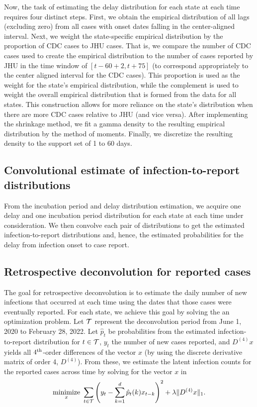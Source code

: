 \documentclass{article}
\begin{document}
Now, the task of estimating the delay distribution for each state at each time
requires four distinct steps. First, we obtain the empirical
distribution of all lags (excluding zero) from all cases with onset dates
falling in the center-aligned interval. Next, we weight the state-specific
empirical distribution by the proportion of CDC cases to JHU cases. That is, we
compare the number of CDC cases used to create the empirical distribution to the
number of cases reported by JHU in the time window of $\left[t - 60 + 2, t +
75\right]$ (to correspond appropriately to the center aligned interval for
the CDC cases). This proportion is used as the weight for the state's empirical
distribution, while the complement is used to weight the overall empirical
distribution that is formed from the data for all states. This construction
allows for more reliance on the state's distribution when there are more CDC
cases relative to JHU (and vice versa). After implementing the shrinkage method,
we fit a gamma density to the resulting empirical distribution by the method of
moments. Finally, we discretize the resulting density to the support set of 1
to 60 days.
 
\subsection{Convolutional estimate of infection-to-report distributions} 

From the incubation period and delay distribution estimation, we acquire one
delay and one incubation period distribution for each state at each time under
consideration. We then convolve each pair of distributions to get the estimated
infection-to-report distributions and, hence, the estimated probabilities for
the delay from infection onset to case report. 

\subsection{Retrospective deconvolution for reported cases}

The goal for retrospective deconvolution is to estimate the daily number of new
infections that occurred at each time using the dates that those cases were eventually
reported. For each state, we
achieve this goal by solving the an optimization problem. 
Let $\mathcal{T}$ represent the deconvolution period from June
1, 2020 to February 28, 2022. Let $\hat{p}_t$ be probabilities from the estimated
infection-to-report distribution for $t \in \mathcal{T}$, $y_t$ the number of new cases
reported, and $D^{(4)}x$ yields all $4^{\textnormal{th}}$-order differences of the vector $x$
(by using the discrete derivative matrix of order 4, $D^{(4)}$). From these,
we estimate the latent infection counts for the reported cases across time by
solving for the vector $x$ in
\begin{align*}
\operatorname*{minimize}_{x}\ \sum_{t \in \mathcal{T}} \left ( y_t -  \sum_{k = 1}^{d} \hat{p}_t(k)x_{t-k} 
\right )^2 + \lambda \|D^{(4)}x\|_1. 
\end{align*}
\end{document}
